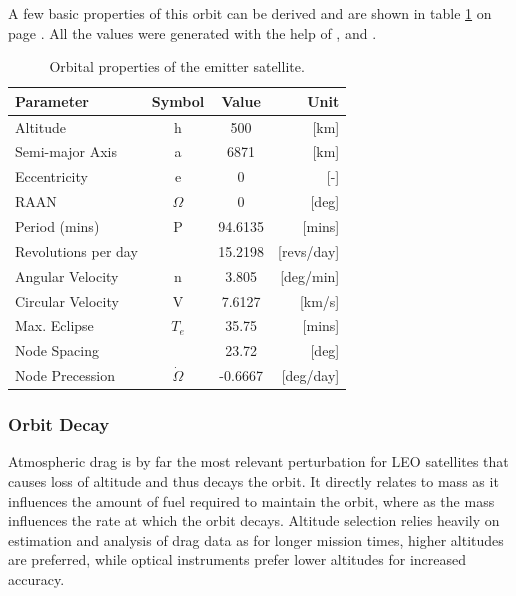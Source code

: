 A few basic properties of this orbit can be derived and are shown in table \ref{table:orb1ref} on page \pageref{table:orb1ref}. All the values were generated with the help of \cite{larson}, \cite{spacedesign} and \cite{constDesign}.

\begin{table}[!h]
\begin{centering}
\begin{tabular}{lccr}
\toprule
Parameter				&			Symbol			&			Value			&			Unit \\
\hline \hline
Altitude				&			h						&			500				&			[km]	 \\
Semi-major Axis	&			a						&			6871			&			[km]	 \\
Eccentricity		&			e						&			0				  &			[-]	 \\
\acs{RAAN}			&			$\Omega$		&			0				&			[deg]	 \\
Period (mins)		&			P						&			94.6135	&			[mins]	 \\
Revolutions per day		&									&			15.2198	&			[revs/day]	 \\
Angular Velocity		&			n						&			3.805	&			[deg/min]	 \\
Circular Velocity		&			V						&			7.6127	&			[km/s]	 \\
Max. Eclipse		&			 	$T_e$					&			35.75	&			[mins]	 \\
Node Spacing	&			 						&			23.72	&			[deg]	 \\
Node Precession	&			 $\dot{\Omega}$					&			-0.6667	&			[deg/day]	 \\
\bottomrule
\end{tabular}
\caption{Orbital properties of the emitter satellite.}
\label{table:orb1ref}
\end{centering}
\end{table}
\subsubsection{Orbit Decay}
\label{frEmOD}
Atmospheric drag is by far the most relevant perturbation for \ac{LEO} satellites that causes loss of altitude and thus decays the orbit. It directly relates to mass as it influences the amount of fuel required to maintain the orbit, where as the mass influences the rate at which the orbit decays. Altitude selection relies heavily on estimation and analysis of drag data as for longer mission times, higher altitudes are preferred, while optical instruments prefer lower altitudes for increased accuracy.

